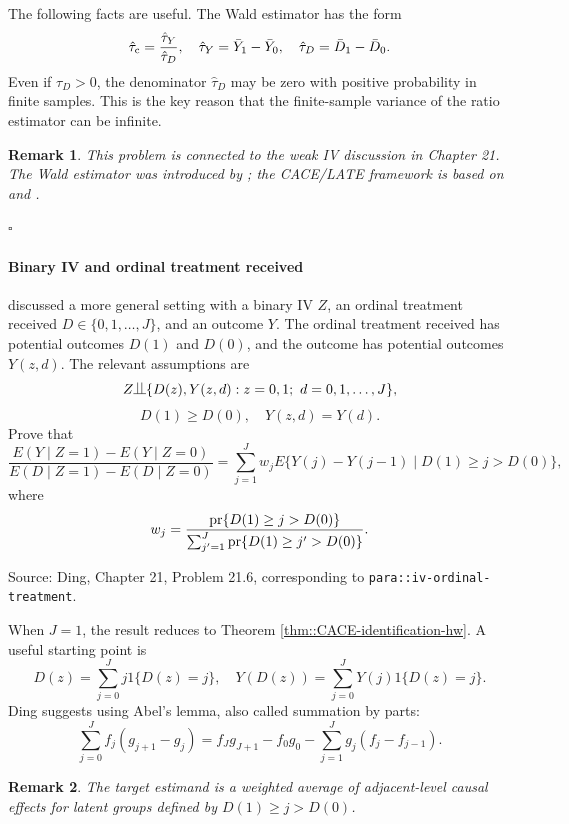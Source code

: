 \documentclass[krantz1]{krantz}
\newcommand{\ri}[1]{\lstinline{#1}}
\newenvironment{mysolution}[1]{\vspace{0.1in} \noindent {\bfseries Solution to Problem {#1}:}}{\hfill$\square$}
\newtheorem{remark}{Remark}
\def\ind{\begin{picture}(9,8)
         \put(0,0){\line(1,0){9}}
         \put(3,0){\line(0,1){8}}
         \put(6,0){\line(0,1){8}}
         \end{picture}
        }
\def\pr{\textup{pr}}
\def\cp{\textup{c}}
\begin{document}
The following facts are useful. The Wald estimator has the form
\[
\hat{\tau}_\cp
=
\frac{\hat{\tau}_Y}{\hat{\tau}_D},
\quad
\hat{\tau}_Y=\bar Y_1-\bar Y_0,
\quad
\hat{\tau}_D=\bar D_1-\bar D_0.
\]
Even if \(\tau_D>0\), the denominator \(\hat\tau_D\) may be zero with positive
probability in finite samples. This is the key reason that the finite-sample
variance of the ratio estimator can be infinite.

\begin{remark}
This problem is connected to the weak IV discussion in Chapter 21. The Wald
estimator was introduced by \citet{wald1940fitting}; the CACE/LATE framework is
based on \citet{imbens1994identification} and \citet{angrist1996identification}.
\end{remark}

\begin{mysolution}{21.1}

\end{mysolution}

\paragraph{Binary IV and ordinal treatment received}\label{para::iv-ordinal-treatment-hw}

\citet{angrist1995two} discussed a more general setting with a binary IV \(Z\),
an ordinal treatment received \(D\in\{0,1,\ldots,J\}\), and an outcome \(Y\).
The ordinal treatment received has potential outcomes \(D(1)\) and \(D(0)\),
and the outcome has potential outcomes \(Y(z,d)\). The relevant assumptions are
\[
Z\ind \{D(z),Y(z,d):z=0,1;\ d=0,1,\ldots,J\},
\]
\[
D(1)\geq D(0),
\quad
Y(z,d)=Y(d).
\]
Prove that
\[
\frac{E(Y\mid Z=1)-E(Y\mid Z=0)}
{E(D\mid Z=1)-E(D\mid Z=0)}
=
\sum_{j=1}^J w_j
E\{Y(j)-Y(j-1)\mid D(1)\geq j>D(0)\},
\]
where
\[
w_j=
\frac{\pr\{D(1)\geq j>D(0)\}}
{\sum_{j'=1}^J\pr\{D(1)\geq j'>D(0)\}}.
\]

Source: Ding, Chapter 21, Problem 21.6, corresponding to
\ri{para::iv-ordinal-treatment}.

When \(J=1\), the result reduces to Theorem
\ref{thm::CACE-identification-hw}. A useful starting point is
\[
D(z)=\sum_{j=0}^J j1\{D(z)=j\},
\quad
Y(D(z))=\sum_{j=0}^J Y(j)1\{D(z)=j\}.
\]
Ding suggests using Abel's lemma, also called summation by parts:
\[
\sum_{j=0}^J f_j(g_{j+1}-g_j)
=
f_Jg_{J+1}-f_0g_0-\sum_{j=1}^J g_j(f_j-f_{j-1}).
\]

\begin{remark}
The target estimand is a weighted average of adjacent-level causal effects for
latent groups defined by \(D(1)\geq j>D(0)\).
\end{remark}
\end{document}
